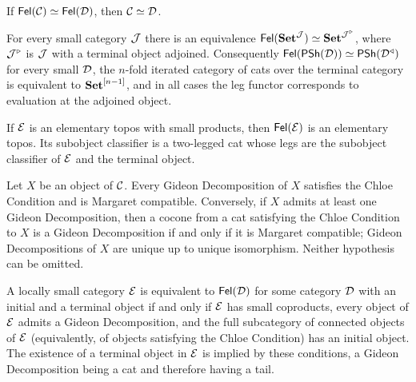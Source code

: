 \begin{mainthm}\label{mthm:reconstruction}
If $\mathsf{Fel}(\mathcal{C})\simeq\mathsf{Fel}(\mathcal{D})$, then $\mathcal{C}\simeq\mathcal{D}$.
\end{mainthm}

\begin{mainthm}\label{mthm:computations}
For every small category $\mathcal{J}$ there is an equivalence
$\mathsf{Fel}(\mathbf{Set}^{\mathcal{J}})\simeq\mathbf{Set}^{\mathcal{J}^{\triangleright}}$, where $\mathcal{J}^{\triangleright}$
is $\mathcal{J}$ with a terminal object adjoined. Consequently
$\mathsf{Fel}(\mathsf{PSh}(\mathcal{D}))\simeq\mathsf{PSh}(\mathcal{D}^{\triangleleft})$ for every small $\mathcal{D}$, the
$n$-fold iterated category of cats over the terminal category is equivalent to
$\mathbf{Set}^{[n-1]}$, and in all cases the leg functor corresponds to evaluation at
the adjoined object.
\end{mainthm}

\begin{mainthm}\label{mthm:topos}
If $\mathcal{E}$ is an elementary topos with small products, then $\mathsf{Fel}(\mathcal{E})$ is an
elementary topos. Its subobject classifier is a two-legged cat whose legs are
the subobject classifier of $\mathcal{E}$ and the terminal object.
\end{mainthm}

\begin{mainthm}\label{mthm:cmg}
Let $X$ be an object of $\mathcal{C}$. Every Gideon Decomposition of $X$ satisfies the
Chloe Condition and is Margaret compatible. Conversely, if $X$ admits at least
one Gideon Decomposition, then a cocone from a cat satisfying the Chloe
Condition to $X$ is a Gideon Decomposition if and only if it is Margaret
compatible; Gideon Decompositions of $X$ are unique up to unique isomorphism.
Neither hypothesis can be omitted.
\end{mainthm}

\begin{mainthm}\label{mthm:recognition}
A locally small category $\mathcal{E}$ is equivalent to $\mathsf{Fel}(\mathcal{D})$ for some category
$\mathcal{D}$ with an initial and a terminal object if and only if $\mathcal{E}$ has small
coproducts, every object of $\mathcal{E}$ admits a Gideon Decomposition, and the full
subcategory of connected objects of $\mathcal{E}$ (equivalently, of objects satisfying
the Chloe Condition) has an initial object. The existence of a terminal object
in $\mathcal{E}$ is implied by these conditions, a Gideon Decomposition being a cat and
therefore having a tail.
\end{mainthm}

